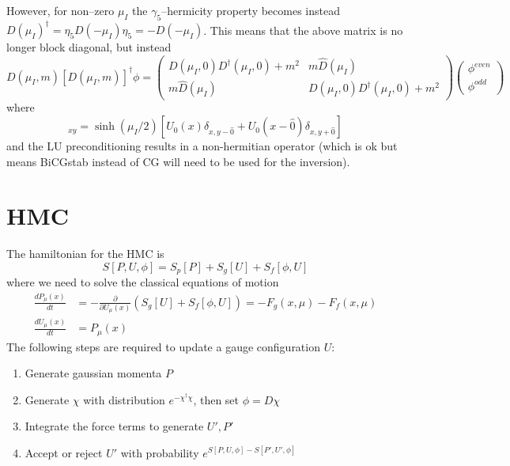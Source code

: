 \documentclass[a4paper,12pt]{article}
\begin{document}
However, for non--zero $\mu_I$ the $\gamma_5$--hermicity property becomes instead $D(\mu_I)^{\dagger} = \eta_5 D(-\mu_I) \eta_5 = -D(-\mu_I)$. This means that the above matrix is 
no longer block diagonal, but instead 
\begin{equation}
D(\mu_I,m) [D(\mu_I,m)]^{\dagger} \phi = 
\begin{pmatrix}
D(\mu_I,0)D^{\dagger}(\mu_I,0) + m^2 & m\hat D(\mu_I) \\
 m\hat D(\mu_I) & D(\mu_I,0)D^{\dagger}(\mu_I,0) + m^2
\end{pmatrix}
\begin{pmatrix}
\phi^{even} \\
\phi^{odd}
\end{pmatrix}
\end{equation}
where
\begin{equation}
 [\hat D(\mu_I)]_{xy} = \sinh(\mu_I/2)\left[U_0(x)\delta_{x,y-\hat0} + U_0(x-\hat0)\delta_{x,y+\hat0}\right]
\end{equation}
and the LU preconditioning results in a non-hermitian operator (which is ok but means BiCGstab instead of CG will need to be used for the inversion).

\section{HMC}
The hamiltonian for the HMC is
\begin{equation}
 S[P, U, \phi] = S_p[P] + S_g[U] + S_f[\phi, U]
\end{equation}
where we need to solve the classical equations of motion
\begin{align}
 \frac{dP_{\mu}(x)}{dt} &= -\frac{\partial}{\partial U_{\mu}(x)}\left(S_g[U] + S_f[\phi, U]\right) = -F_g(x,\mu) - F_f(x,\mu) \\
 \frac{dU_{\mu}(x)}{dt} &= P_{\mu}(x)
\end{align}
The following steps are required to update a gauge configuration $U$:
\begin{enumerate}
 \item Generate gaussian momenta $P$
 \item Generate $\chi$ with distribution $e^{-\chi^{\dagger}\chi}$, then set $\phi = D\chi$
 \item Integrate the force terms to generate $U', P'$
 \item Accept or reject $U'$ with probability $e^{S[P, U, \phi] - S[P', U', \phi]}$
\end{enumerate}
\end{document}
